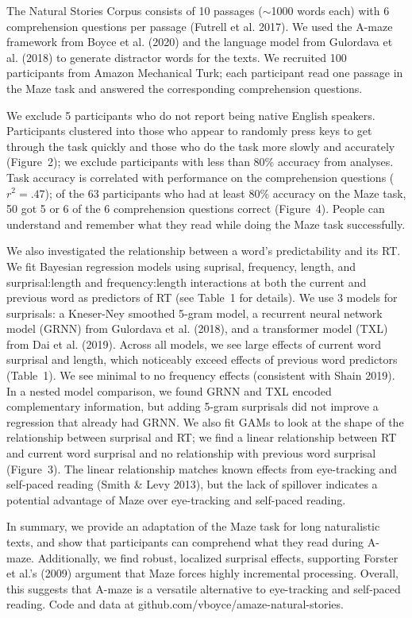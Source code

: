 \documentclass[11pt,a4paper]{article}
\begin{document}
The Natural Stories Corpus consists of 10 passages ($\sim$1000 words each) with 6 comprehension questions per passage (Futrell et al. 2017). We used the A-maze framework from Boyce et al. (2020) and the language model from Gulordava et al. (2018) to generate distractor words for the texts. We recruited 100 participants from Amazon Mechanical Turk; each participant read one passage in the Maze task and answered the corresponding comprehension questions. 

We exclude 5 participants who do not report being native English speakers. Participants clustered into those who appear to randomly press keys to get through the task quickly and those who do the task more slowly and accurately (Figure~2); we exclude participants with less than 80\% accuracy from analyses. Task accuracy is correlated with performance on the comprehension questions ($r^2=.47$); of the 63 participants who had at least 80\% accuracy on the Maze task, 50 got 5 or 6 of the 6 comprehension questions correct (Figure~4). People can understand and remember what they read while doing the Maze task successfully.

We also investigated the relationship between a word's predictability and its RT. We fit Bayesian regression models using suprisal, frequency, length, and surprisal:length and frequency:length interactions at both the current and previous word as predictors of RT (see Table~1 for details). We use 3 models for surprisals: a Kneser-Ney smoothed 5-gram model, a recurrent neural network model (GRNN) from Gulordava et al. (2018), and a transformer model (TXL) from Dai et al. (2019). Across all models, we see large effects of current word surprisal and length, which noticeably exceed effects of previous word predictors (Table~1). We see minimal to no frequency effects (consistent with Shain 2019). In a nested model comparison, we found GRNN and TXL encoded complementary information, but adding 5-gram surprisals did not improve a regression that already had GRNN. We also fit GAMs to look at the shape of the relationship between surprisal and RT; we find a linear relationship between RT and current word surprisal and no relationship with previous word surprisal (Figure~3). The linear relationship matches known effects from eye-tracking and self-paced reading (Smith \& Levy 2013), but the lack of spillover indicates a potential advantage of Maze over eye-tracking and self-paced reading.


In summary, we provide an adaptation of the Maze task for long naturalistic texts, and show that participants can comprehend what they read during A-maze. Additionally, we find robust, localized surprisal effects, supporting Forster et al.'s (2009) argument that Maze forces highly incremental processing. Overall, this suggests that A-maze is a versatile alternative to eye-tracking and self-paced reading. Code and data at github.com/vboyce/amaze-natural-stories. 
\end{document}
